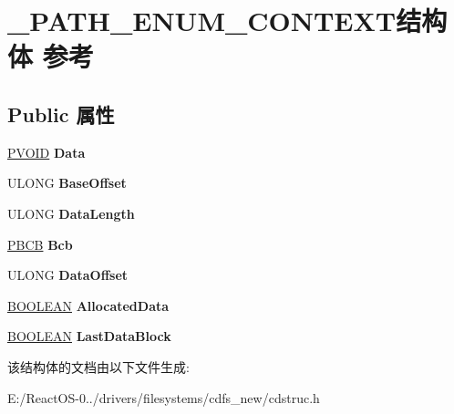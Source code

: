 \hypertarget{struct___p_a_t_h___e_n_u_m___c_o_n_t_e_x_t}{}\section{\+\_\+\+P\+A\+T\+H\+\_\+\+E\+N\+U\+M\+\_\+\+C\+O\+N\+T\+E\+X\+T结构体 参考}
\label{struct___p_a_t_h___e_n_u_m___c_o_n_t_e_x_t}
\subsection*{Public 属性}
\begin{DoxyCompactItemize}
\item 
\mbox{\label{struct___p_a_t_h___e_n_u_m___c_o_n_t_e_x_t_a7623916c45920d1e85c716634fc8bd44}} 
\hyperlink{interfacevoid}{P\+V\+O\+ID} {\bfseries Data}
\item 
\mbox{\label{struct___p_a_t_h___e_n_u_m___c_o_n_t_e_x_t_a9d8104740b1549e6fb14e9304f62d823}} 
U\+L\+O\+NG {\bfseries Base\+Offset}
\item 
\mbox{\label{struct___p_a_t_h___e_n_u_m___c_o_n_t_e_x_t_aeebf791f925172082c634b2f17f16d9f}} 
U\+L\+O\+NG {\bfseries Data\+Length}
\item 
\mbox{\label{struct___p_a_t_h___e_n_u_m___c_o_n_t_e_x_t_a92155b012efcc7486630b75c9fe1a618}} 
\hyperlink{interfacevoid}{P\+B\+CB} {\bfseries Bcb}
\item 
\mbox{\label{struct___p_a_t_h___e_n_u_m___c_o_n_t_e_x_t_ab72a2077c0e0bf821c36c49c1055df1b}} 
U\+L\+O\+NG {\bfseries Data\+Offset}
\item 
\mbox{\label{struct___p_a_t_h___e_n_u_m___c_o_n_t_e_x_t_a1baf6188c9ce7c1009d5ade659344250}} 
\hyperlink{_processor_bind_8h_a112e3146cb38b6ee95e64d85842e380a}{B\+O\+O\+L\+E\+AN} {\bfseries Allocated\+Data}
\item 
\mbox{\label{struct___p_a_t_h___e_n_u_m___c_o_n_t_e_x_t_af073dffa3d74a8d4ad2f6523703da1ad}} 
\hyperlink{_processor_bind_8h_a112e3146cb38b6ee95e64d85842e380a}{B\+O\+O\+L\+E\+AN} {\bfseries Last\+Data\+Block}
\end{DoxyCompactItemize}


该结构体的文档由以下文件生成\+:\begin{DoxyCompactItemize}
\item 
E\+:/\+React\+O\+S-\/0../drivers/filesystems/cdfs\+\_\+new/cdstruc.\+h\end{DoxyCompactItemize}

